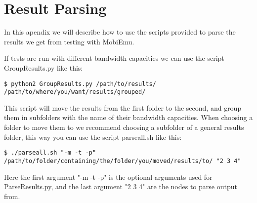 \section{Result Parsing}\label{Result Parsing}
    In this apendix we will describe how to use the scripts provided to parse the results we get from testing with MobiEmu.
    
    If tests are run with different bandwidth capacities we can use the script GroupResults.py like this:
    \lstset{language=bash}
    \begin{lstlisting}
$ python2 GroupResults.py /path/to/results/ /path/to/where/you/want/results/grouped/
    \end{lstlisting}
    This script will move the results from the first folder to the second, and group them in subfolders with the name of their bandwidth capacities. When choosing a folder to move them to we recommend choosing a subfolder of a general results folder, this way you can use the script parseall.sh like this:
    \begin{lstlisting}
$ ./parseall.sh "-m -t -p" /path/to/folder/containing/the/folder/you/moved/results/to/ "2 3 4"
    \end{lstlisting}
    Here the first argument "-m -t -p" is the optional arguments used for ParseResults.py, and the last argument "2 3 4" are the nodes to parse output from.
